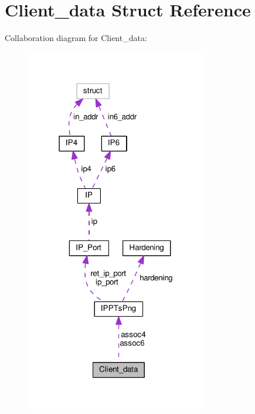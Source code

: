 \hypertarget{struct_client__data}{\section{Client\+\_\+data Struct Reference}
\label{struct_client__data}
}


Collaboration diagram for Client\+\_\+data\+:\nopagebreak
\begin{figure}[H]
\begin{center}
\leavevmode
\includegraphics[width=226pt]{struct_client__data__coll__graph}
\end{center}
\end{figure}
